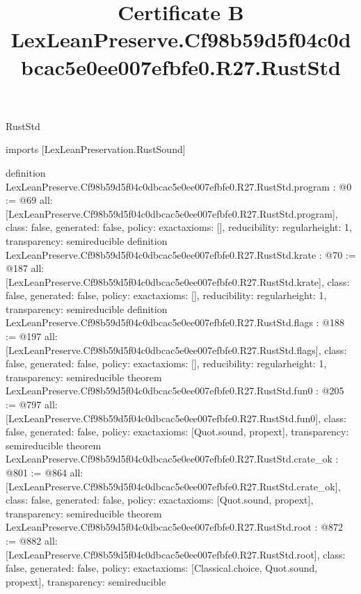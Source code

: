 \begin{lexlean}{RustStd}
\title{Certificate B LexLeanPreserve.Cf98b59d5f04c0dbcac5e0ee007efbfe0.R27.RustStd}
\begin{coremodule}
imports [LexLeanPreservation.RustSound]

definition LexLeanPreserve.Cf98b59d5f04c0dbcac5e0ee007efbfe0.R27.RustStd.program : @0 := @69 {
  all: [LexLeanPreserve.Cf98b59d5f04c0dbcac5e0ee007efbfe0.R27.RustStd.program],
  class: false,
  generated: false,
  policy: exact{axioms: []},
  reducibility: regular{height: 1},
  transparency: semireducible
}
definition LexLeanPreserve.Cf98b59d5f04c0dbcac5e0ee007efbfe0.R27.RustStd.krate : @70 := @187 {
  all: [LexLeanPreserve.Cf98b59d5f04c0dbcac5e0ee007efbfe0.R27.RustStd.krate],
  class: false,
  generated: false,
  policy: exact{axioms: []},
  reducibility: regular{height: 1},
  transparency: semireducible
}
definition LexLeanPreserve.Cf98b59d5f04c0dbcac5e0ee007efbfe0.R27.RustStd.flags : @188 := @197 {
  all: [LexLeanPreserve.Cf98b59d5f04c0dbcac5e0ee007efbfe0.R27.RustStd.flags],
  class: false,
  generated: false,
  policy: exact{axioms: []},
  reducibility: regular{height: 1},
  transparency: semireducible
}
theorem LexLeanPreserve.Cf98b59d5f04c0dbcac5e0ee007efbfe0.R27.RustStd.fun0 : @205 := @797 {
  all: [LexLeanPreserve.Cf98b59d5f04c0dbcac5e0ee007efbfe0.R27.RustStd.fun0],
  class: false,
  generated: false,
  policy: exact{axioms: [Quot.sound, propext]},
  transparency: semireducible
}
theorem LexLeanPreserve.Cf98b59d5f04c0dbcac5e0ee007efbfe0.R27.RustStd.crate_ok : @801 := @864 {
  all: [LexLeanPreserve.Cf98b59d5f04c0dbcac5e0ee007efbfe0.R27.RustStd.crate_ok],
  class: false,
  generated: false,
  policy: exact{axioms: [Quot.sound, propext]},
  transparency: semireducible
}
theorem LexLeanPreserve.Cf98b59d5f04c0dbcac5e0ee007efbfe0.R27.RustStd.root : @872 := @882 {
  all: [LexLeanPreserve.Cf98b59d5f04c0dbcac5e0ee007efbfe0.R27.RustStd.root],
  class: false,
  generated: false,
  policy: exact{axioms: [Classical.choice, Quot.sound, propext]},
  transparency: semireducible
}


\end{coremodule}
\end{lexlean}
